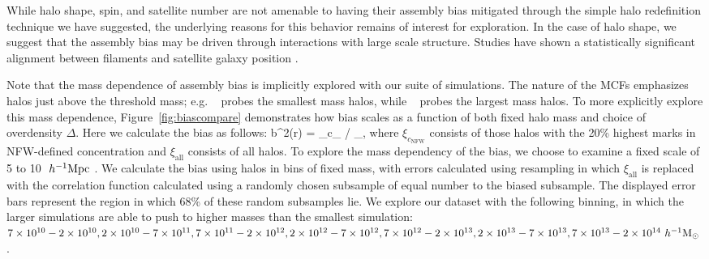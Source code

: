 \documentclass[usenatbib]{mnras}
\begin{document}


While halo shape, spin, and satellite number are not amenable to having their assembly bias mitigated through the
simple halo redefinition technique we have suggested, the underlying reasons for this behavior remains of
interest for exploration. In the case of halo shape, we suggest that the assembly bias may be driven through
interactions with large scale structure. Studies have shown a statistically significant alignment between
filaments and satellite galaxy position \citep{tempel_etal15, velliscig_etal15}.

Note that the mass dependence of assembly bias is implicitly explored with our suite of simulations.
The nature of the MCFs emphasizes halos just above the threshold mass; e.g. \simA~ probes the smallest mass
halos, while \simB~ probes the largest mass halos. To more explicitly explore this mass dependence, Figure~\ref{fig:biascompare}
demonstrates how bias scales as a function of both fixed halo mass and choice of overdensity $\Delta$. Here we calculate the bias as follows:
\beq
b^2(r) = \xi_{c_} / \xi_{},
\eeq
where $\xi_{c_\mathrm{NFW}}$ consists of those halos with the 20\% highest marks in NFW-defined concentration
and $\xi_{\mathrm{all}}$ consists of all halos. To explore the mass dependency of the bias, we choose to
examine a fixed scale of 5 to 10 $\ h^{-1}\mathrm{Mpc}~$. We calculate the bias using halos in bins of fixed mass, with errors
calculated using resampling in which $\xi_{\mathrm{all}}$ is replaced with the correlation function calculated
using a randomly chosen subsample of equal number to the biased subsample. The displayed error bars represent
the region in which 68\% of these random subsamples lie. We explore our dataset with the following binning,
in which the larger simulations are able to push to higher masses than the smallest simulation:
$7\times10^{10}-2\times10^{10}, 2\times10^{10}-7\times10^{11},7\times10^{11}-2\times10^{12},
2\times10^{12}-7\times10^{12},7\times10^{12}-2\times10^{13},2\times10^{13}-7\times10^{13},
7\times10^{13}-2\times10^{14} \ h^{-1}\mathrm{M}_{\odot}~$.
\end{document}
